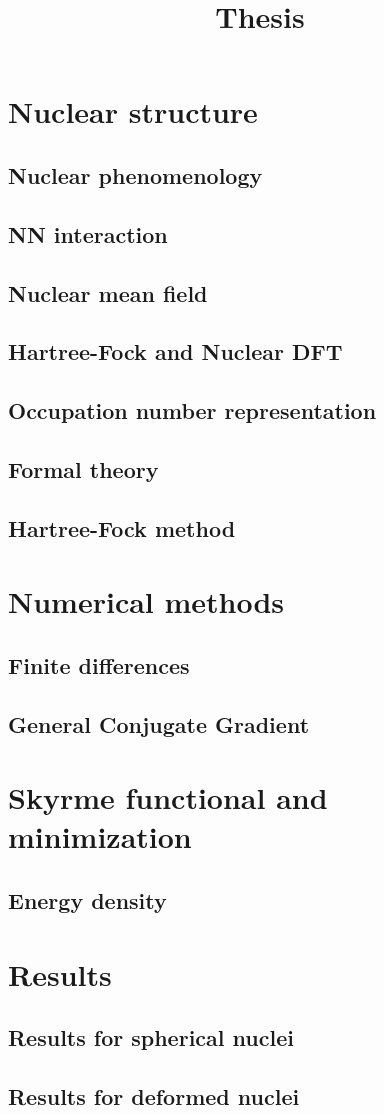 \documentclass{book}
\title{Thesis}
\date{}
\begin{document}
\maketitle
\tableofcontents

\chapter{Nuclear structure}
\section{Nuclear phenomenology}
\section{NN interaction}
\section{Nuclear mean field}

\section{Hartree-Fock and Nuclear DFT}
\section{Occupation number representation}
\section{Formal theory}
\section{Hartree-Fock method}

\chapter{Numerical methods}
\section{Finite differences}
\section{General Conjugate Gradient}

\chapter{Skyrme functional and minimization}
\section{Energy density}
\section{}


\chapter{Results}
\section{Results for spherical nuclei}
\section{Results for deformed nuclei}
\end{document}
